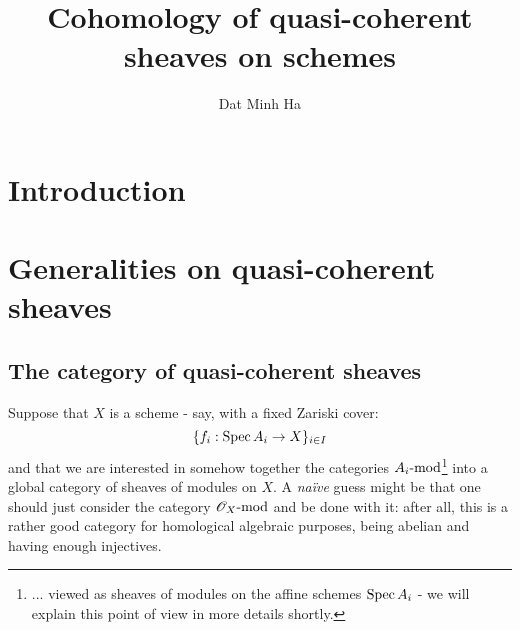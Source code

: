 

\setcounter{section}{-1}





    \title{Cohomology of quasi-coherent sheaves on schemes}
    
    \author{Dat Minh Ha}
    \maketitle
    
    \begin{abstract}
        
    \end{abstract}
    
    {
      \hypersetup{} 
      \tableofcontents %
    }

    \section{Introduction}

    \section{Generalities on quasi-coherent sheaves}
        \subsection{The category of quasi-coherent sheaves}
            Suppose that $X$ is a scheme - say, with a fixed Zariski cover:
                $$\{ f_i: \Spec A_i \to X \}_{i \in I}$$
            and that we are interested in somehow  together the categories $A_i\mod$\footnote{... viewed as sheaves of modules on the affine schemes $\Spec A_i$ - we will explain this point of view in more details shortly.} into a global category of sheaves of modules on $X$. A \textit{na\"ive} guess might be that one should just consider the category $\scrO_X\mod$ and be done with it: after all, this is a rather good category for homological algebraic purposes, being abelian and having enough injectives.
            
